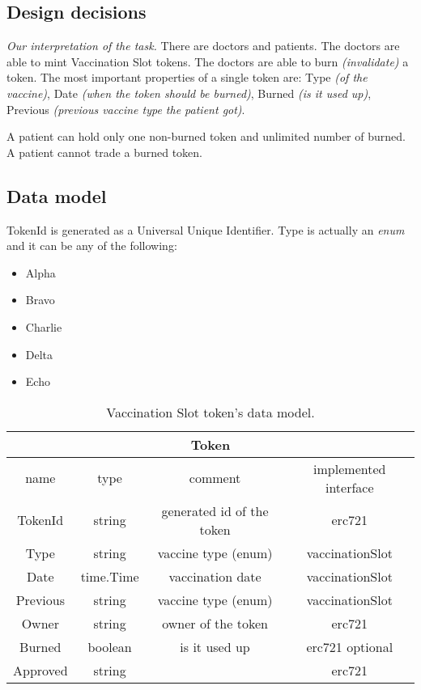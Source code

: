 \newcommand{\function}[4]{
  \textbf{#1} (\emph{#2}): #3 \newline
  \emph{\color{teal} #4}
}


\subsection{Design decisions}
\emph{Our interpretation of the task.} There are doctors and patients. The doctors are able to mint Vaccination Slot tokens. The doctors are able to burn \emph{(invalidate)} a token. The most important properties of a single token are: Type \emph{(of the vaccine)}, Date \emph{(when the token should be burned)}, Burned \emph{(is it used up)}, Previous \emph{(previous vaccine type the patient got)}.

A patient can hold only one non-burned token and unlimited number of burned. A patient cannot trade a burned token.


\subsection{Data model}
TokenId is generated as a Universal Unique Identifier. Type is actually an \emph{enum} and it can be any of the following:
\begin{itemize}
  \item Alpha
  \item Bravo
  \item Charlie
  \item Delta
  \item Echo
\end{itemize}

\begin{center}
  \begin{table}[!ht]
    \centering
    \begin{tabular}{|c | c | c | c |}
      \hline
      \multicolumn{4}{|c|}{Token}                                              \\
      \hline
      name     & type      & comment                   & implemented interface \\
      \hline
      TokenId  & string    & generated id of the token & erc721                \\
      Type     & string    & vaccine type (enum)       & vaccinationSlot       \\
      Date     & time.Time & vaccination date          & vaccinationSlot       \\
      Previous & string    & vaccine type (enum)       & vaccinationSlot       \\
      Owner    & string    & owner of the token        & erc721                \\
      Burned   & boolean   & is it used up             & erc721 optional       \\
      Approved & string    &                           & erc721                \\
      \hline
    \end{tabular}
    \caption{Vaccination Slot token's data model.}
  \end{table}
\end{center}



